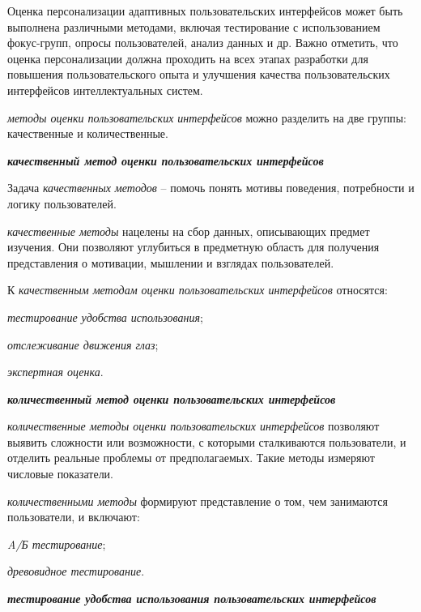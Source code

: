\begin{textitemize}
	Оценка персонализации адаптивных пользовательских интерфейсов может быть выполнена различными методами, включая тестирование с использованием фокус-групп, опросы пользователей, анализ данных и др.
	Важно отметить, что оценка персонализации должна проходить на всех этапах разработки для повышения пользовательского опыта и улучшения качества пользовательских интерфейсов интеллектуальных систем.
\end{textitemize}


\textit{методы оценки пользовательских интерфейсов} можно разделить на две группы: качественные и количественные.

\textbf{\textit{качественный метод оценки пользовательских интерфейсов}}
	
Задача \textit{качественных методов} -- помочь понять мотивы поведения, потребности и логику пользователей.
	
\textit{качественные методы} нацелены на сбор данных, описывающих предмет изучения. Они позволяют углубиться в предметную область для получения представления о мотивации, мышлении и взглядах пользователей. 
	
К \textit{качественным методам оценки пользовательских интерфейсов} относятся:
\begin{textitemize}
	\item \textit{тестирование удобства использования};
	\item \textit{отслеживание движения глаз};
	\item \textit{экспертная оценка}.
\end{textitemize}	
	
\textbf{\textit{количественный метод оценки пользовательских интерфейсов}}

\textit{количественные методы оценки пользовательских интерфейсов} позволяют выявить сложности или возможности, с которыми сталкиваются пользователи, и отделить реальные проблемы от предполагаемых.
Такие методы измеряют числовые показатели. 

\textit{количественными методы} формируют представление о том, чем занимаются пользователи, и включают:
\begin{textitemize}
	\item \textit{A/Б тестирование};
	\item \textit{древовидное тестирование}.
\end{textitemize}	


\textbf{\textit{тестирование удобства использования пользовательских интерфейсов}} 

